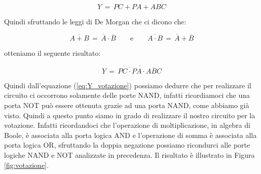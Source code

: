 \begin{equation*}
	Y\,=\,PC+PA+ABC 
\end{equation*}

Quindi sfruttando le leggi di De Morgan che ci dicono che:

\begin{equation*}
	\overline{A+B}\,=\,\overline{A} \cdot \overline{B} \qquad \text{e} \qquad \overline{A \cdot B}\,=\,\overline{A}+\overline{B}
\end{equation*}

otteniamo il seguente risultato:

\begin{equation}
	Y\,=\, \overline{ \overline{PC \cdot PA} \cdot \overline{ABC} }
\label{eq:Y_votazione}
\end{equation}

Quindi dall'equazione (\ref{eq:Y_votazione}) possiamo dedurre che per realizzare il circuito ci occorrono solamente delle porte NAND, infatti ricordiamoci che una porta NOT può essere ottenuta grazie ad una porta NAND, come abbiamo già visto. Quindi a questo punto siamo in grado di realizzare il nostro circuito per la votazione. Infatti ricordandoci che l'operazione di moltiplicazione, in algebra di Boole, è associata alla porta logica AND e l'operazione di somma è associata alla porta logica OR, sfruttando la doppia negazione possiamo ricondurci alle porte logiche NAND e NOT analizzate in precedenza. Il risultato è illustrato in Figura \ref{fig:votazione}.


